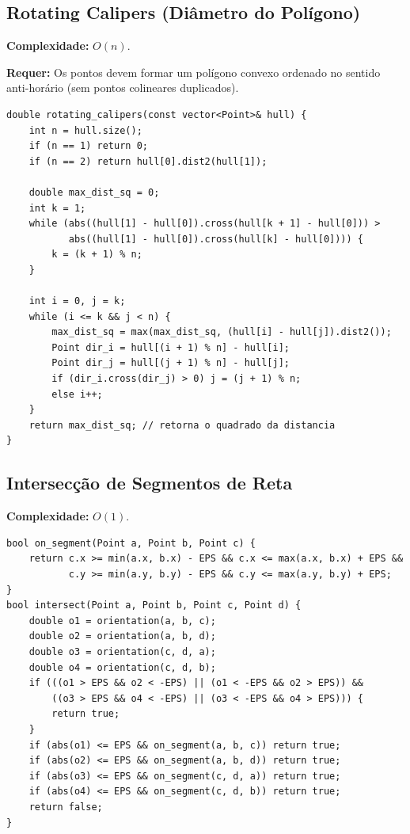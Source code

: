 \subsection{Rotating Calipers (Diâmetro do Polígono)}

\textbf{Complexidade:} $O(n)$.

\textbf{Requer:} Os pontos devem formar um polígono convexo ordenado no sentido anti-horário (sem pontos colineares duplicados).

\begin{lstlisting}
double rotating_calipers(const vector<Point>& hull) {
    int n = hull.size();
    if (n == 1) return 0;
    if (n == 2) return hull[0].dist2(hull[1]);

    double max_dist_sq = 0;
    int k = 1;
    while (abs((hull[1] - hull[0]).cross(hull[k + 1] - hull[0])) > 
           abs((hull[1] - hull[0]).cross(hull[k] - hull[0]))) {
        k = (k + 1) % n;
    }

    int i = 0, j = k;
    while (i <= k && j < n) {
        max_dist_sq = max(max_dist_sq, (hull[i] - hull[j]).dist2());
        Point dir_i = hull[(i + 1) % n] - hull[i];
        Point dir_j = hull[(j + 1) % n] - hull[j];
        if (dir_i.cross(dir_j) > 0) j = (j + 1) % n;
        else i++;
    }
    return max_dist_sq; // retorna o quadrado da distancia
}
\end{lstlisting}


\subsection{Intersecção de Segmentos de Reta}

\textbf{Complexidade:} $O(1)$.

\begin{lstlisting}
bool on_segment(Point a, Point b, Point c) {
    return c.x >= min(a.x, b.x) - EPS && c.x <= max(a.x, b.x) + EPS &&
           c.y >= min(a.y, b.y) - EPS && c.y <= max(a.y, b.y) + EPS;
}
bool intersect(Point a, Point b, Point c, Point d) {
    double o1 = orientation(a, b, c);
    double o2 = orientation(a, b, d);
    double o3 = orientation(c, d, a);
    double o4 = orientation(c, d, b);
    if (((o1 > EPS && o2 < -EPS) || (o1 < -EPS && o2 > EPS)) &&
        ((o3 > EPS && o4 < -EPS) || (o3 < -EPS && o4 > EPS))) {
        return true;
    }
    if (abs(o1) <= EPS && on_segment(a, b, c)) return true;
    if (abs(o2) <= EPS && on_segment(a, b, d)) return true;
    if (abs(o3) <= EPS && on_segment(c, d, a)) return true;
    if (abs(o4) <= EPS && on_segment(c, d, b)) return true;
    return false;
}
\end{lstlisting}


